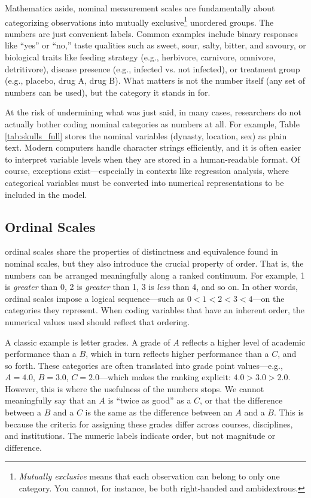 Mathematics aside, nominal measurement scales are fundamentally about categorizing observations into mutually exclusive\footnote{\textit{Mutually exclusive} means that each observation can belong to only one category. You cannot, for instance, be both right-handed and ambidextrous.} unordered groups. The numbers are just convenient labels. Common examples include binary responses like ``yes'' or ``no,'' taste qualities such as sweet, sour, salty, bitter, and savoury, or biological traits like feeding strategy (e.g., herbivore, carnivore, omnivore, detritivore), disease presence (e.g., infected vs. not infected), or treatment group (e.g., placebo, drug A, drug B). What matters is not the number itself (any set of numbers can be used), but the category it stands in for. 

At the risk of undermining what was just said, in many cases, researchers do not actually bother coding nominal categories as numbers at all. For example, Table \ref{tab:skulls_full} stores the nominal variables (dynasty, location, sex) as plain text. Modern computers handle character strings efficiently, and it is often easier to interpret variable levels when they are stored in a human-readable format. Of course, exceptions exist—especially in contexts like regression analysis, where categorical variables must be converted into numerical representations to be included in the model.

\subsection{Ordinal Scales}
\label{sec:ordinal}

\Glspl{ordinal scale} share the properties of distinctness and equivalence found in nominal scales, but they also introduce the crucial property of order. That is, the numbers can be arranged meaningfully along a ranked continuum. For example,  1 is \textit{greater} than 0, 2 is \textit{greater} than 1, 3 is \textit{less} than 4, and so on. In other words, ordinal scales impose a logical sequence—such as $0 < 1 < 2 < 3 < 4$—on the categories they represent. When coding variables that have an inherent order, the numerical values used should reflect that ordering.

A classic example is letter grades. A grade of $A$ reflects a higher level of academic performance than a $B$, which in turn reflects higher performance than a $C$, and so forth. These categories are often translated into grade point values—e.g., $A = 4.0$, $B = 3.0$, $C = 2.0$—which makes the ranking explicit: $4.0 > 3.0 > 2.0$. However, this is where the usefulness of the numbers stops. We cannot meaningfully say that an $A$ is ``twice as good'' as a $C$, or that the difference between a $B$ and a $C$ is the same as the difference between an $A$ and a $B$. This is because the criteria for assigning these grades differ across courses, disciplines, and institutions. The numeric labels indicate order, but not magnitude or difference.

